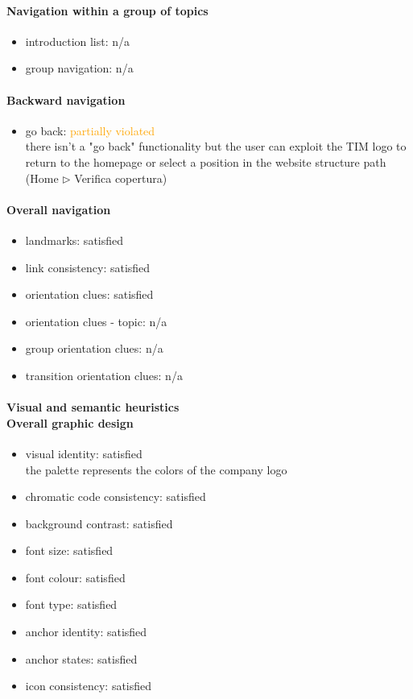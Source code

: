 \begin{enumerate}
	\paragraph*{Navigation within a group of topics}
	\begin{itemize}
		\item introduction list: n/a
		\item group navigation: n/a
	\end{itemize}
	
	\paragraph*{Backward navigation}
	\begin{itemize}
		\item go back: \textcolor {orange}{partially violated}\\
		there isn't a "go back" functionality but the user can exploit the TIM logo to return to the homepage or select a position in the website structure path (Home $\triangleright$ Verifica copertura)
	\end{itemize}
	
	\paragraph*{Overall navigation}
	\begin{itemize}
		\item landmarks: satisfied
		\item link consistency: satisfied
		\item orientation clues: satisfied
		\item orientation clues - topic: n/a
		\item group orientation clues: n/a
		\item transition orientation clues: n/a
	\end{itemize}	
	
	\paragraph*{Visual and semantic heuristics \\ Overall graphic design }
	\begin{itemize}
		\item visual identity: satisfied\\
		the palette represents the colors of the company logo
		\item chromatic code consistency: satisfied
		\item background contrast: satisfied
		\item font size: satisfied
		\item font colour: satisfied
		\item font type: satisfied
		\item anchor identity: satisfied
		\item anchor states: satisfied
		\item icon consistency: satisfied
	\end{itemize}
	

\end{enumerate}
